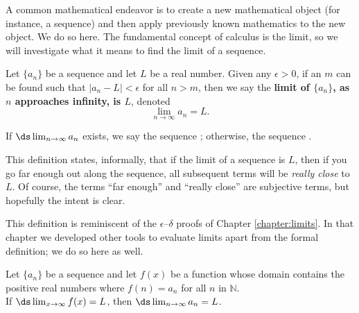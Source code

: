 A common mathematical endeavor is to create a new mathematical object (for instance, a sequence) and then apply previously known mathematics to the new object. We do so here. The fundamental concept of calculus is the limit, so we will investigate what it means to find the limit of a sequence.

{Let $\{a_n\}$ be a sequence and let $L$ be a real number. Given any $\epsilon>0$, if an $m$ can be found such that $|a_n-L|<\epsilon$ for all $n>m$, then we say the \textbf{limit of $\{a_n\}$, as $n$ approaches infinity, is $L$}, denoted $$\lim_{n\to\infty}a_n = L.$$

If $\ds\lim_{n\to\infty} a_n$ exists, we say the sequence ; otherwise, the sequence .
}
\restoreboxwidth


This definition states, informally, that if the limit of a sequence is $L$, then if you go far enough out along the sequence, all subsequent terms will be \emph{really close} to $L$. Of course, the terms ``far enough'' and ``really close'' are subjective terms, but hopefully the intent is clear.

This definition is reminiscent of the $\epsilon$--$\delta$ proofs of Chapter \ref{chapter:limits}. In that chapter we developed other tools to evaluate limits apart from the formal definition; we do so here as well.

{Let $\{a_n\}$ be a sequence and let $f(x)$ be a function whose domain contains the positive real numbers where $f(n) = a_n$ for all $n$ in $\mathbb{N}$. \\

If $\ds \lim_{x\to\infty} f(x) = L$, then $\ds\lim_{n\to\infty} a_n = L$.
}
\restoreboxwidth

